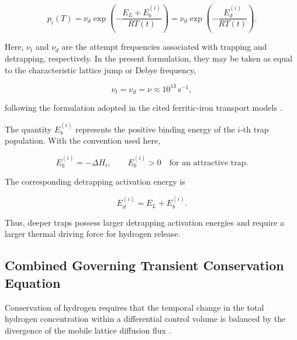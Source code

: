 \begin{equation}
p_i(T)
=
\nu_d
\exp\left(
-\frac{E_L+E_b^{(i)}}{RT(t)}
\right)
=
\nu_d
\exp\left(
-\frac{E_d^{(i)}}{RT(t)}
\right).
\label{eq:ch3_arrhenius_pi}
\end{equation}

Here, $\nu_t$ and $\nu_d$ are the attempt frequencies associated with
trapping and detrapping, respectively. In the present formulation,
they may be taken as equal to the characteristic lattice jump or
Debye frequency,

\begin{equation}
\nu_t=\nu_d=\nu
\approx 10^{13}\,\mathrm{s^{-1}},
\label{eq:ch3_debye_frequency}
\end{equation}

following the formulation adopted in the cited ferritic-iron
transport models \cite{Turnbull1997,Legrand2015,Diaz2020,Marrani2025}.

The quantity $E_b^{(i)}$ represents the positive binding energy of the
$i$-th trap population. With the convention used here,

\begin{equation}
E_b^{(i)}=-\Delta H_i,
\qquad
E_b^{(i)}>0
\quad\text{for an attractive trap}.
\label{eq:ch3_binding_energy_convention}
\end{equation}

The corresponding detrapping activation energy is

\begin{equation}
E_d^{(i)}
=
E_L+E_b^{(i)}.
\label{eq:ch3_detrapping_energy}
\end{equation}

Thus, deeper traps possess larger detrapping activation energies and
require a larger thermal driving force for hydrogen release.

\subsection{Combined Governing Transient Conservation Equation}
\label{subsec:governing_pde}

Conservation of hydrogen requires that the temporal change in the
total hydrogen concentration within a differential control volume is
balanced by the divergence of the mobile lattice diffusion flux
\cite{McNabb1963,Turnbull1997,Legrand2015,Marrani2025}.

